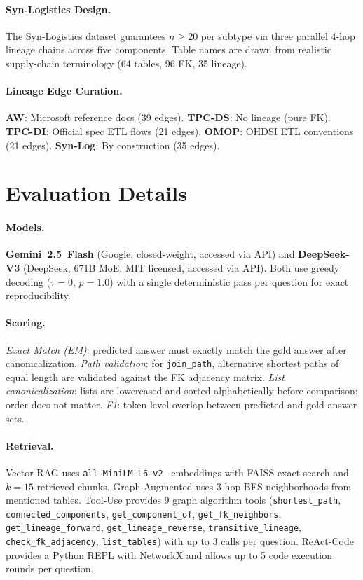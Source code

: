 \paragraph{Syn-Logistics Design.}
The Syn-Logistics dataset guarantees $n\geq20$ per subtype via three
parallel 4-hop lineage chains across five components. Table names are drawn
from realistic supply-chain terminology (64 tables, 96 FK, 35 lineage).

\paragraph{Lineage Edge Curation.}
\textbf{AW}: Microsoft reference docs (39 edges).
\textbf{TPC-DS}: No lineage (pure FK).
\textbf{TPC-DI}: Official spec ETL flows (21 edges).
\textbf{OMOP}: OHDSI ETL conventions (21 edges).
\textbf{Syn-Log}: By construction (35 edges).

\section{Evaluation Details}
\label{app:decoding}

\paragraph{Models.}
\textbf{Gemini~2.5~Flash} (Google, closed-weight, accessed via API) and
\textbf{DeepSeek-V3} (DeepSeek, 671B MoE, MIT licensed, accessed via API).
Both use greedy decoding ($\tau{=}0$, $p{=}1.0$) with a single
deterministic pass per question for exact reproducibility.

\paragraph{Scoring.}
\emph{Exact Match (EM)}: predicted answer must exactly match the gold
answer after canonicalization.
\emph{Path validation}: for \texttt{join\_path}, alternative shortest
paths of equal length are validated against the FK adjacency matrix.
\emph{List canonicalization}: lists are lowercased and sorted
alphabetically before comparison; order does not matter.
\emph{F1}: token-level overlap between predicted and gold answer sets.

\begin{sloppypar}
\paragraph{Retrieval.}
Vector-RAG uses \texttt{all-MiniLM-L6-v2}~\cite{reimers2019sentencebert}
embeddings with FAISS exact search and $k{=}15$ retrieved chunks.
Graph-Augmented uses 3-hop BFS neighborhoods from mentioned tables.
Tool-Use provides 9 graph algorithm tools
(\texttt{shortest\_path},
\texttt{connected\_components},
\texttt{get\_component\_of},
\texttt{get\_fk\_neighbors},
\texttt{get\_lineage\_forward},
\texttt{get\_lineage\_reverse},
\texttt{transitive\_lineage},
\texttt{check\_fk\_adjacency},
\texttt{list\_tables})
with up to 3 calls per question.
ReAct-Code provides a Python REPL with NetworkX and allows up to 5 code
execution rounds per question.
\end{sloppypar}

